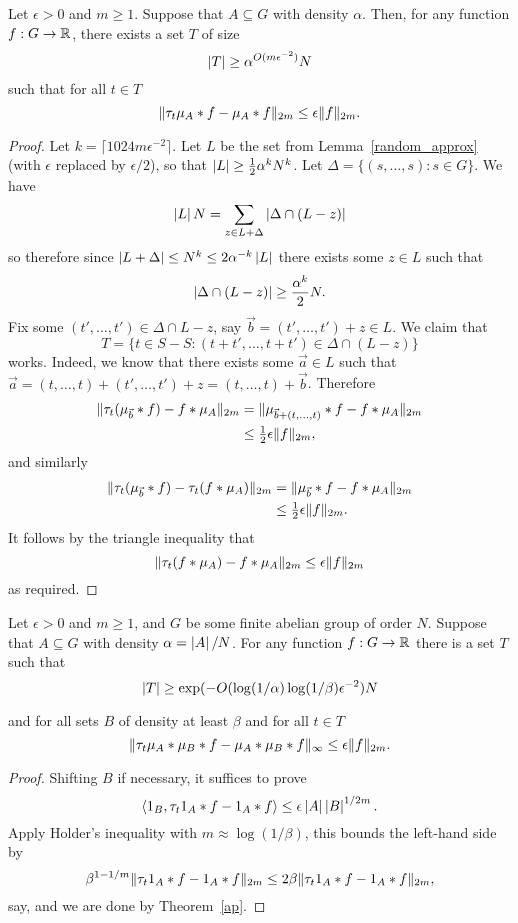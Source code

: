 \begin{theorem}\label{ap}
Let $\epsilon>0$ and $m\geq 1$. Suppose that $A\subseteq G$ with density $\alpha$. Then, for any function $f:G\to\mathbb{R}$, there exists a set $T$ of size
\[\left\lvert T\right\rvert\geq \alpha^{O(m\epsilon^{-2})}N\]
such that for all $t\in T$
\[\lVert \tau_t \mu_A\ast f-\mu_A\ast f\rVert_{2m}\leq \epsilon \lVert f\rVert_{2m}.\]
\end{theorem}
\begin{proof}
Let $k=\lceil 1024m\epsilon^{-2}\rceil$. Let $L$ be the set from Lemma~\ref{random_approx} (with $\epsilon$ replaced by $\epsilon/2$), so that $\left\lvert L\right\rvert\geq \tfrac{1}{2}\alpha^kN^k$. Let $\Delta=\{(s,\ldots,s) : s \in G\}$. We have
\[\left\lvert L\right\rvert N= \sum_{z\in L+\Delta}\left\lvert \Delta\cap(L-z)\right\rvert\]
so therefore since $\left\lvert L+\Delta\right\rvert\leq N^k\leq 2\alpha^{-k}\left\lvert L\right\rvert$ there exists some $z\in L$ such that
\[\left\lvert \Delta\cap(L-z)\right\rvert\geq \frac{\alpha^k}{2}N.\]
Fix some $(t',\ldots,t')\in \Delta\cap L-z$, say $\vec{b}=(t',\ldots,t')+z\in L$. We claim that
\[T = \{ t\in S-S : (t+t',\ldots,t+t')\in \Delta\cap (L-z)\}\]
works. Indeed, we know that there exists some $\vec{a}\in L$ such that $\vec{a}=(t,\ldots,t)+(t',\ldots,t')+z=(t,\ldots,t)+\vec{b}$. Therefore
\begin{align*}
\lVert \tau_{t}(\mu_{\vec{b}}\ast f) - f\ast \mu_A\rVert_{2m}
&=
\lVert \mu_{\vec{b}+(t,\ldots,t)}\ast f - f\ast \mu_A\rVert_{2m}
\\
&\leq \tfrac{1}{2}\epsilon \lVert f\rVert_{2m},
\end{align*}
and similarly
\begin{align*}
\lVert \tau_{t}(\mu_{\vec{b}}\ast f) - \tau_{t}(f\ast \mu_A)\rVert_{2m}
&=
\lVert \mu_{\vec{b}}\ast f - f\ast \mu_A\rVert_{2m}\\
&\leq \tfrac{1}{2}\epsilon \lVert f\rVert_{2m}.
\end{align*}
It follows by the triangle inequality that
\[\lVert \tau_{t}(f\ast \mu_A) - f\ast \mu_A\rVert_{2m}\leq \epsilon \lVert f\rVert_{2m}\]
as required.
\end{proof}



\begin{theorem}\label{linfty_ap}
Let $\epsilon>0$ and $m\geq 1$, and $G$ be some finite abelian group of order $N$. Suppose that $A\subseteq G$ with density $\alpha=\left\lvert A\right\rvert/N$. For any function $f:G\to\mathbb{R}$ there is a set $T$ such that
\[\left\lvert T\right\rvert\geq \exp(-O(\log(1/\alpha)\log(1/\beta)\epsilon^{-2})N\]

and for all sets $B$ of density at least $\beta$ and for all $t\in T$
\[\lVert \tau_t \mu_A\ast \mu_B\ast f- \mu_A\ast \mu_B\ast f\rVert_{\infty}\leq \epsilon \lVert f\rVert_{2m}.\]
\end{theorem}
\begin{proof}
Shifting $B$ if necessary, it suffices to prove 
\[\langle 1_{B}, \tau_t 1_{A}\ast f-1_{A}\ast f\rangle \leq  \epsilon \left\lvert A\right\rvert\left\lvert B\right\rvert^{1/2m}.\]
Apply Holder's inequality with $m\approx \log(1/\beta)$, this bounds the left-hand side by 
\[\beta^{1-1/m}\lVert \tau_t1_{A}\ast f-1_{A}\ast f\rVert_{2m}\leq 2\beta \lVert \tau_t1_{A}\ast f-1_{A}\ast f\rVert_{2m},\]
say, and we are done by Theorem~\ref{ap}.
\end{proof}


